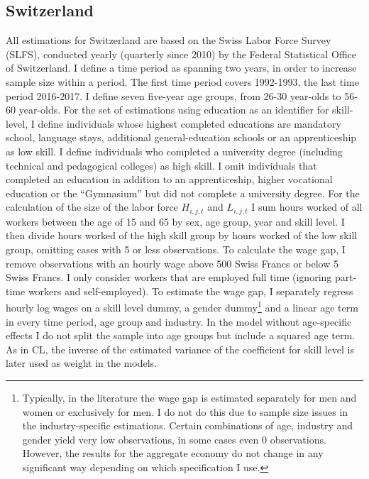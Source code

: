 \documentclass[]{article}
\begin{document}
\subsection{Switzerland} \label{sec:ch} All estimations for
Switzerland are based on the Swiss Labor Force Survey (SLFS),
conducted yearly (quarterly since 2010) by the Federal Statistical
Office of Switzerland. I define a time period as spanning two years,
in order to increase sample size within a period. The first time
period covers 1992-1993, the last time period 2016-2017. I define
seven five-year age groups, from 26-30 year-olds to 56-60
year-olds. For the set of estimations using education as an identifier
for skill-level, I define individuals whose highest completed
educations are mandatory school, language stays, additional
general-education schools or an apprenticeship as low skill. I define
individuals who completed a university degree (including technical and
pedagogical colleges) as high skill. I omit individuals that completed
an education in addition to an apprenticeship, higher vocational
education or the ``Gymnasium'' but did not complete a university
degree. For the calculation of the size of the labor force $H_{i,j,t}$
and $L_{i,j,t}$ I sum hours worked of all workers between the age of
15 and 65 by sex, age group, year and skill level. I then divide hours
worked of the high skill group by hours worked of the low skill group,
omitting cases with 5 or less observations.  To calculate the wage
gap, I remove observations with an hourly wage above 500 Swiss Francs
or below 5 Swiss Francs. I only consider workers that are employed
full time (ignoring part-time workers and self-employed). To estimate
the wage gap, I separately regress hourly log wages on a skill level
dummy, a gender dummy\footnote{Typically, in the literature the wage
  gap is estimated separately for men and women or exclusively for
  men. I do not do this due to sample size issues in the
  industry-specific estimations. Certain combinations of age, industry
  and gender yield very low observations, in some cases even 0
  observations. However, the results for the aggregate economy do not
  change in any significant way depending on which specification I
  use.} and a linear age term in every time period, age group and
industry. In the model without age-specific effects I do not split the
sample into age groups but include a squared age term. As in CL, the
inverse of the estimated variance of the coefficient for skill level
is later used as weight in the models.
\end{document}
